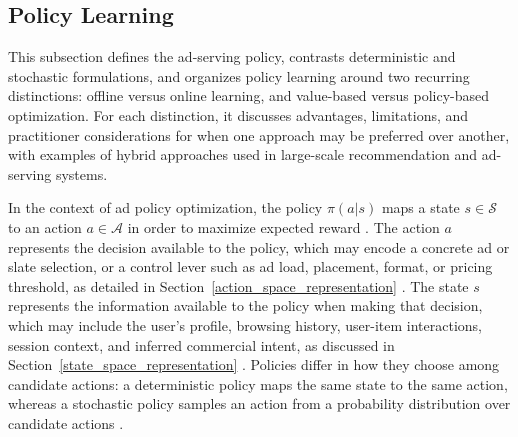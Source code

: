 \documentclass[manuscript,review,screen]{acmart}
\begin{document}
\subsection{Policy Learning} \label{policy_learning}

This subsection defines the ad-serving policy, contrasts deterministic and stochastic formulations, and organizes policy learning around two recurring distinctions: offline versus online learning, and value-based versus policy-based optimization. For each distinction, it discusses advantages, limitations, and practitioner considerations for when one approach may be preferred over another, with examples of hybrid approaches used in large-scale recommendation and ad-serving systems.

In the context of ad policy optimization, the policy $\pi(a|s)$ maps a state $s \in \mathcal{S}$ to an action $a \in \mathcal{A}$ in order to maximize expected reward \cite{Sutton1998}. The action $a$ represents the decision available to the policy, which may encode a concrete ad or slate selection, or a control lever such as ad load, placement, format, or pricing threshold, as detailed in Section~\ref{action_space_representation} \cite{zhang2018whole, zhao2021dear, ie2019slateq}. The state $s$ represents the information available to the policy when making that decision, which may include the user's profile, browsing history, user-item interactions, session context, and inferred commercial intent, as discussed in Section~\ref{state_space_representation} \cite{pancha2022pinnerformer, xia2023transact, Zhou2019}. Policies differ in how they choose among candidate actions: a deterministic policy maps the same state to the same action, whereas a stochastic policy samples an action from a probability distribution over candidate actions \cite{Sutton1998}.
\end{document}

